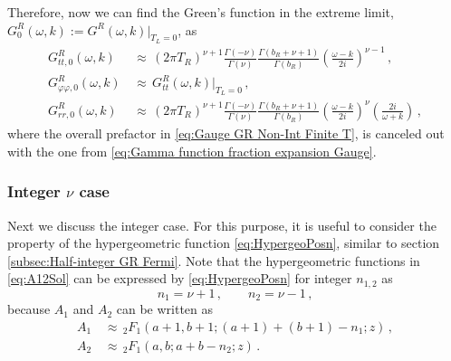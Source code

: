 \documentclass[11pt,a4paper]{article}
\begin{document}
Therefore, now we can find the Green's function in the extreme limit, $G^{R}_{0}(\omega,k):=G^R(\omega,k)|_{T_L=0}$, as
\begin{equation} \label{eq:Gauge GR Non-Int Zero T}
\begin{aligned}
    G^R_{tt,0}(\omega,k) \, & \approx \, (2\pi T_R)^{\nu+1} \frac{\Gamma(-\nu)}{\Gamma(\nu)} \frac{\Gamma(b_R+\nu+1)}{\Gamma(b_R)}\left( \frac{\omega-k}{2i} \right)^{\nu-1}\,,\\
    G^R_{\varphi\varphi,0}(\omega,k) \, & \approx \, G^R_{tt}(\omega,k)|_{T_L=0} \,,\\
    G^R_{rr,0}(\omega,k) \, & \approx \, (2\pi T_R)^{\nu+1} \frac{\Gamma(-\nu)}{\Gamma(\nu)} \frac{\Gamma(b_R+\nu+1)}{\Gamma(b_R)}\left( \frac{\omega-k}{2i} \right)^{\nu} \left( \frac{2i}{\omega+k} \right)\,,
\end{aligned}
\end{equation}
where the overall prefactor in \eqref{eq:Gauge GR Non-Int Finite T}, is canceled out with the one from \eqref{eq:Gamma function fraction expansion Gauge}.

\subsubsection{Integer $\nu$ case}
Next we discuss the integer case. For this purpose, it is useful to consider the property of the hypergeometric function \eqref{eq:HypergeoPosn}, similar to section \ref{subsec:Half-integer GR Fermi}. Note that the hypergeometric functions in \eqref{eq:A12Sol} can be expressed by \eqref{eq:HypergeoPosn} for integer $n_{1,2}$ as
\begin{equation}
    n_{1}=\nu + 1\,, \qquad n_{2}=\nu - 1\,,
\end{equation}
because $A_1$ and $A_2$ can be written as
\begin{equation}
\begin{aligned}
    A_1 \, & \approx \, {}_2 F_{1}(a+1, b+1; (a+1)+(b+1)-n_1; z)\,, \\
    A_2 \, & \approx \, {}_2 F_{1}(a, b; a+b-n_2; z)\,.
\end{aligned}
\end{equation}
\end{document}
